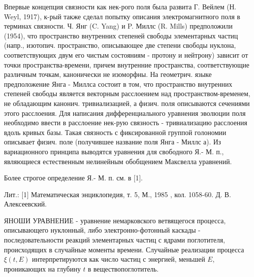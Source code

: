 \documentclass[10pt]{article}
\begin{document}
Впервые концепция связности как нек-рого поля была развита Г. Вейлем (Н. Weyl, 1917), к-рый также сделал попытку описания электромагнитного поля в терминах связности. Ч. Янг (C. Yang) и P. Миллс (R. Mills) предположили (1954), что пространство внутренних степеней свободы элементарных частиц (напр., изотопич. пространство, описывающее две степени свободы нуклона, соответствующих двум его чистым состояниям - протону и нейтрону) зависит от точки пространства-времени, причем внутренние пространства, соответствующие различным точкам, канонически не изоморфны. На геометрич. языке предположение Янга - Миллса состоит в том, что пространство внутренних степеней свободы является векторным расслоением над пространством-временем, не обладающим канонич. тривиализацией, а физич. поля описываются сечениями этого расслоения. Для написания дифференциального уравнения эволюции поля необходимо ввести в расслоение нек-рую связность - тривиализацию расслоения вдоль кривых базы. Такая связность с фиксированной группой голономии описывает физич. поле (получившее название поля Янга - Миллс а). Из вариационного принципа выводятся уравнения для свободного Я.- М. п., являющиеся естественным нелинейным обобщением Максвелла уравнений.



Более строгое определение Я.- М. п. см. в [1].



Лит.: [1] Математическая энциклопедия, т. 5, М., 1985 , кол. 1058-60. Д. В. Алексеевский.



ЯНОШИ УРАВНЕНИЕ - уравнение немарковского ветвящегося процесса, описывающего нуклонный, либо электронно-фотонный каскады - последовательности реакций элементарных частиц с ядрами поглотителя, происходящих в случайные моменты времени. Случайные реализации процесса $\xi(t, E)$ интерпретируются как число частиц с энергией, меньшей $E$, проникающих на глубину $t$ в веществопоглотитель.
\end{document}
